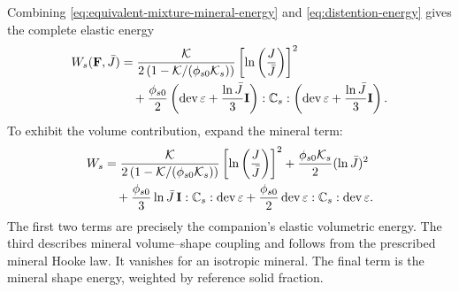 Combining \eqref{eq:equivalent-mixture-mineral-energy} and
\eqref{eq:distention-energy} gives the complete elastic energy
\begin{align}
 W_s(\mathbf F,\bar J)
 &=\frac{\mathcal{K}}{2\left(1-\mathcal{K}/(\phi_{s0}\mathcal{K}_s)\right)}
             \left[\ln\left(\frac J{\bar J}\right)\right]^2
 \nonumber\\
 &\quad+\frac{\phi_{s0}}2
 \left(\operatorname{dev}\mathbf\varepsilon+\frac{\ln\bar J}{3}\mathbf I\right)
 :\mathbb{C}_s:
 \left(\operatorname{dev}\mathbf\varepsilon+\frac{\ln\bar J}{3}\mathbf I\right).
 \label{eq:equivalent-anisotropic-energy}
\end{align}
To exhibit the volume contribution, expand the mineral term:
\begin{align}
 W_s
 &=\frac{\mathcal{K}}{2\left(1-\mathcal{K}/(\phi_{s0}\mathcal{K}_s)\right)}
             \left[\ln\left(\frac J{\bar J}\right)\right]^2
 +\frac{\phi_{s0}\mathcal{K}_s}{2}(\ln\bar J)^2
 \nonumber\\
 &\quad+\frac{\phi_{s0}}3\ln\bar J\,
        \mathbf I:\mathbb{C}_s:\operatorname{dev}\mathbf\varepsilon
 +\frac{\phi_{s0}}2\operatorname{dev}\mathbf\varepsilon:\mathbb{C}_s:
                                      \operatorname{dev}\mathbf\varepsilon.
 \label{eq:equivalent-volumetric-energy}
\end{align}
The first two terms are precisely the companion's elastic volumetric
energy. The third describes mineral volume--shape coupling and follows
from the prescribed mineral Hooke law. It vanishes for an isotropic mineral.
The final term is the mineral shape energy, weighted by reference solid
fraction.

